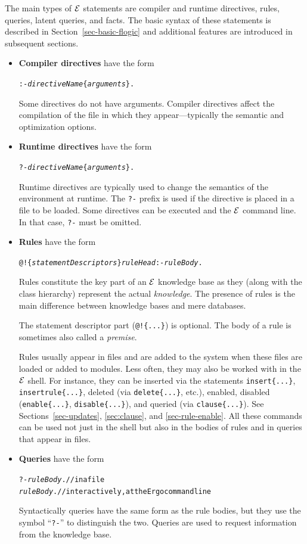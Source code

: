 \documentclass[11pt]{article}
\newcommand{\ERGO}{\mbox{\ensuremath{\cal{E}}\smaller{{\sc{RGO}}}}\xspace}
\newcommand{\FLSYSTEM}{\ERGO}
\begin{document}
The main types of \FLSYSTEM statements are compiler and runtime directives,
rules, queries, latent queries, and facts. The basic syntax of these
statements is described in Section~\ref{sec-basic-flogic} and additional
features are introduced in subsequent sections.
\begin{itemize}
\item  \textbf{Compiler directives} have the form
\begin{alltt}
     :- \emph{directiveName}\{\emph{arguments}\}. 
\end{alltt}
  Some directives do not have arguments. Compiler directives affect the
  compilation of the file in which they appear---typically the
  semantic and optimization options.
\item \textbf{Runtime directives} have the form
\begin{alltt}
     ?- \emph{directiveName}\{\emph{arguments}\}. 
\end{alltt}
  Runtime directives are typically used to change the semantics of the
  environment at runtime.
  The \texttt{?-} prefix is used if the directive is placed in a file to be
  loaded. Some directives can be executed and the \ERGO command line.
  In that case, \texttt{?-} must be omitted.
\item \textbf{Rules} have the form
\begin{alltt}
     @!\{\emph{statementDescriptors}\}  \emph{ruleHead}  :-  \emph{ruleBody}. 
\end{alltt}
  Rules constitute the key part of an \FLSYSTEM knowledge base
  as they (along with the class hierarchy)
  represent the actual \emph{knowledge}.
  The presence of rules is the main difference between knowledge bases and
  mere databases.

  The statement descriptor part
  (\texttt{@!\{...\}})  is optional. The body of a rule is sometimes also
  called a \emph{premise}. 

  Rules usually appear in files and are added to the system when these
  files are loaded or added to modules. Less often,
  they may also be worked with in the \FLSYSTEM shell.
  For instance, they can be inserted via the
  statements \texttt{insert\{...\}}, \texttt{insertrule\{...\}}, 
  deleted (via \texttt{delete\{...\}}, etc.), enabled, disabled
  (\texttt{enable\{...\}}, \texttt{disable\{...\}}),
  and queried (via \texttt{clause\{...\}}).
  See Sections~\ref{sec-updates}, \ref{sec:clause}, and \ref{sec-rule-enable}.
  All these commands can be used not just in the shell but also in the
  bodies of rules and in queries that appear in files.
\item \textbf{Queries} have the form
\begin{alltt}
     ?- \emph{ruleBody}.   // in a file \\
     \emph{ruleBody}.      // interactively, at the Ergo command line
\end{alltt}
  Syntactically queries have the same form as the rule bodies, but they use
  the symbol ``\texttt{?-}''  to distinguish the two. Queries are
  used to request information from the knowledge base.


\end{itemize}
\end{document}
